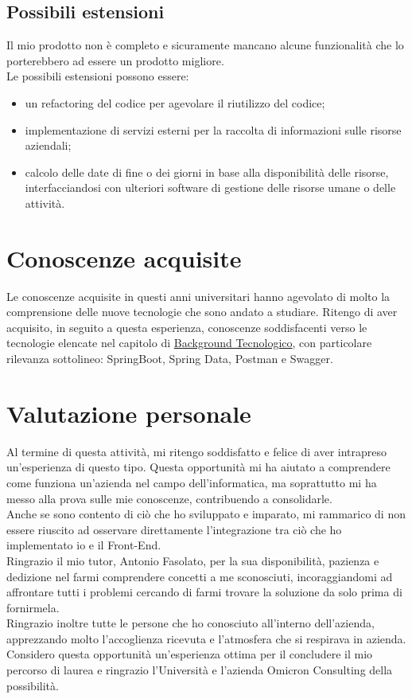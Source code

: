 \subsection{Possibili estensioni}
Il mio prodotto non è completo e sicuramente mancano alcune funzionalità che lo porterebbero ad essere un prodotto migliore.\\
Le possibili estensioni possono essere:
\begin{itemize}
\item un refactoring del codice per agevolare il riutilizzo del codice;
\item implementazione di servizi esterni per la raccolta di informazioni sulle risorse aziendali;
\item calcolo delle date di fine o dei giorni in base alla disponibilità delle risorse, interfacciandosi con ulteriori software di gestione delle risorse umane o delle attività.
\end{itemize} 

\section{Conoscenze acquisite}
Le conoscenze acquisite in questi anni universitari hanno agevolato di molto la comprensione delle nuove tecnologie che sono andato a studiare. Ritengo di aver acquisito, in seguito a questa esperienza, conoscenze soddisfacenti verso le tecnologie elencate nel capitolo di \hyperlink{tecnologie}{Background Tecnologico}, con particolare rilevanza sottolineo: SpringBoot, Spring Data, Postman e Swagger.

\section{Valutazione personale}
Al termine di questa attività, mi ritengo soddisfatto e felice di aver intrapreso un'esperienza di questo tipo. Questa opportunità mi ha aiutato a comprendere come funziona un'azienda nel campo dell'informatica, ma soprattutto mi ha messo alla prova sulle mie conoscenze, contribuendo a consolidarle.\\
Anche se sono contento di ciò che ho sviluppato e imparato, mi rammarico di non essere riuscito ad osservare direttamente l'integrazione tra ciò che ho implementato io e il Front-End.\\
Ringrazio il mio tutor, Antonio Fasolato, per la sua disponibilità, pazienza e dedizione nel farmi comprendere concetti a me sconosciuti, incoraggiandomi ad affrontare tutti i problemi cercando di farmi trovare la soluzione da solo prima di fornirmela.\\
Ringrazio inoltre tutte le persone che ho conosciuto all'interno dell'azienda, apprezzando molto l'accoglienza ricevuta e l'atmosfera che si respirava in azienda.\\
Considero questa opportunità un'esperienza ottima per il concludere il mio percorso di laurea e ringrazio l'Università e l'azienda Omicron Consulting della possibilità.
